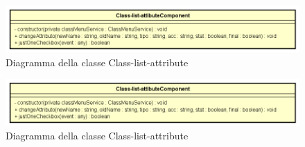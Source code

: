\begin{figure}[h!]
	\centering
	\includegraphics[scale=0.8]{res/sections/SpecificaFrontEnd/Components/Disegnetti/class-list-attribute.png}
	\caption{Diagramma della classe Class-list-attribute}
\end{figure}

\begin{figure}[h!]
	\centering
	\includegraphics[scale=0.8]{res/sections/SpecificaFrontEnd/Components/Disegnetti/class-list-attribute.png}
	\caption{Diagramma della classe Class-list-attribute}
\end{figure}

